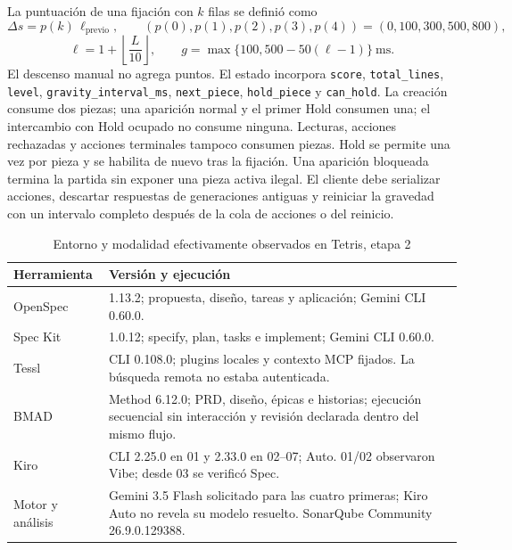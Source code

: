 La puntuación de una fijación con $k$ filas se definió como
\[
 \Delta s = p(k)\,\ell_{\mathrm{previo}},\qquad
 (p(0),p(1),p(2),p(3),p(4))=(0,100,300,500,800),
\]
\[
 \ell=1+\left\lfloor\frac{L}{10}\right\rfloor,\qquad
 g=\max\{100,500-50(\ell-1)\}\ \mathrm{ms}.
\]
El descenso manual no agrega puntos. El estado incorpora \texttt{score}, \texttt{total\_lines}, \texttt{level}, \texttt{gravity\_interval\_ms}, \texttt{next\_piece}, \texttt{hold\_piece} y \texttt{can\_hold}. La creación consume dos piezas; una aparición normal y el primer Hold consumen una; el intercambio con Hold ocupado no consume ninguna. Lecturas, acciones rechazadas y acciones terminales tampoco consumen piezas. Hold se permite una vez por pieza y se habilita de nuevo tras la fijación. Una aparición bloqueada termina la partida sin exponer una pieza activa ilegal. El cliente debe serializar acciones, descartar respuestas de generaciones antiguas y reiniciar la gravedad con un intervalo completo después de la cola de acciones o del reinicio.

\begin{table}[H]\centering\small\setlength{\tabcolsep}{4pt}\renewcommand{\arraystretch}{1.06}
\caption{Entorno y modalidad efectivamente observados en Tetris, etapa 2}
\label{tab:entorno_tetris_e2}
\begin{tabularx}{\textwidth}{l Y}\toprule

\textbf{Herramienta} & \textbf{Versión y ejecución} \\ \midrule

OpenSpec & 1.13.2; propuesta, diseño, tareas y aplicación; Gemini CLI 0.60.0. \\

Spec Kit & 1.0.12; specify, plan, tasks e implement; Gemini CLI 0.60.0. \\

Tessl & CLI 0.108.0; plugins locales y contexto MCP fijados. La búsqueda remota no estaba autenticada. \\

BMAD & Method 6.12.0; PRD, diseño, épicas e historias; ejecución secuencial sin interacción y revisión declarada dentro del mismo flujo. \\

Kiro & CLI 2.25.0 en 01 y 2.33.0 en 02--07; Auto. 01/02 observaron Vibe; desde 03 se verificó Spec. \\

Motor y análisis & Gemini 3.5 Flash solicitado para las cuatro primeras; Kiro Auto no revela su modelo resuelto. SonarQube Community 26.9.0.129388. \\

\bottomrule\end{tabularx}

\end{table}

